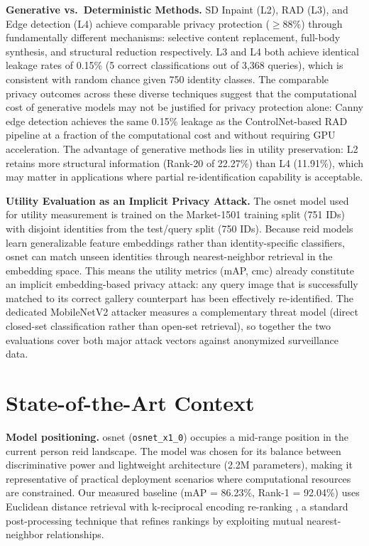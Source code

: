 \textbf{Generative vs.\ Deterministic Methods.}
SD Inpaint (L2), RAD (L3), and Edge detection (L4) achieve comparable privacy protection ($\geq$88\%) through fundamentally different mechanisms: selective content replacement, full-body synthesis, and structural reduction respectively. L3 and L4 both achieve identical leakage rates of 0.15\% (5 correct classifications out of 3,368 queries), which is consistent with random chance given 750 identity classes. The comparable privacy outcomes across these diverse techniques suggest that the computational cost of generative models may not be justified for privacy protection alone: Canny edge detection achieves the same 0.15\% leakage as the ControlNet-based RAD pipeline at a fraction of the computational cost and without requiring GPU acceleration. The advantage of generative methods lies in utility preservation: L2 retains more structural information (Rank-20 of 22.27\%) than L4 (11.91\%), which may matter in applications where partial re-identification capability is acceptable.

\textbf{Utility Evaluation as an Implicit Privacy Attack.}
The \acrshort{osnet} model used for utility measurement is trained on the Market-1501 training split (751 IDs) with disjoint identities from the test/query split (750 IDs). Because \acrshort{reid} models learn generalizable feature embeddings rather than identity-specific classifiers, \acrshort{osnet} can match unseen identities through nearest-neighbor retrieval in the embedding space. This means the utility metrics (mAP, \acrshort{cmc}) already constitute an implicit embedding-based privacy attack: any query image that is successfully matched to its correct gallery counterpart has been effectively re-identified. The dedicated MobileNetV2 attacker measures a complementary threat model (direct closed-set classification rather than open-set retrieval), so together the two evaluations cover both major attack vectors against anonymized surveillance data.


\section{State-of-the-Art Context}

\textbf{Model positioning.} \acrshort{osnet} (\texttt{osnet\_x1\_0}) \cite{zhou2019osnet} occupies a mid-range position in the current person \acrshort{reid} landscape. The model was chosen for its balance between discriminative power and lightweight architecture (2.2M parameters), making it representative of practical deployment scenarios where computational resources are constrained. Our measured baseline (mAP = 86.23\%, Rank-1 = 92.04\%) uses Euclidean distance retrieval with k-reciprocal encoding re-ranking \cite{zhong2017reranking}, a standard post-processing technique that refines rankings by exploiting mutual nearest-neighbor relationships.

